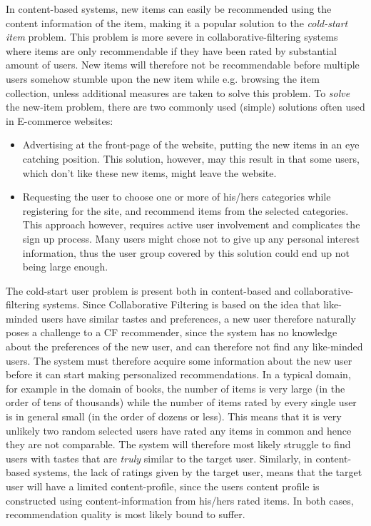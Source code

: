In content-based systems, new items can easily be recommended using the content
information of the item, making it a popular solution to the \emph{cold-start
item} problem. This problem is more severe in collaborative-filtering systems
where items are only recommendable if they have been rated by substantial
amount of users. New items will therefore not be recommendable before multiple
users somehow stumble upon the new item while e.g. browsing the item
collection, unless additional measures are taken to solve this problem. To
\emph{solve} the new-item problem, there are two commonly used (simple)
solutions often used in E-commerce websites:

\begin{itemize}

\item Advertising at the front-page of the website, putting the new items in an
eye catching position. This solution, however, may this result in that some
users, which don't like these new items, might leave the website.
\item Requesting the user to choose one or more of his/hers categories while
registering for the site, and recommend items from the selected categories.
This approach however, requires active user involvement and complicates the
sign up process. Many users might chose not to give up any personal interest
information, thus the user group covered by this solution could end up not
being large enough.
\end{itemize}

The cold-start user problem is present both in content-based and collaborative-filtering systems.
Since Collaborative Filtering is based on the idea that like-minded users have similar tastes and
preferences, a new user therefore naturally poses a challenge to a CF recommender, since the system has no knowledge about
the preferences of the new user, and can therefore not find any like-minded users. The system must therefore acquire some
information about the new user before it can start making personalized recommendations. In a typical domain, for example
in the domain of books, the number of items is very large (in the order of tens of thousands) while the number of items
rated by every single user is in general small (in the order of dozens or less). This means that it is very unlikely two
random selected users have rated any items in common and hence they are not comparable. The system will therefore most
likely struggle to find users with tastes that are \emph{truly} similar to the target user. Similarly, in content-based
systems, the lack of ratings given by the target user, means that the target user will have a limited content-profile,
since the users content profile is constructed using content-information from his/hers rated items. In both cases,
recommendation quality is most likely bound to suffer.\newline

